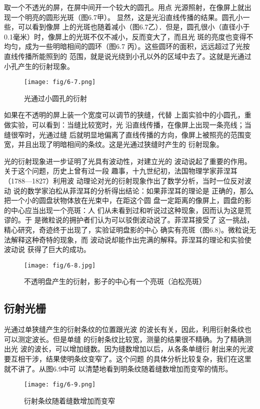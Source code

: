 取一个不透光的屏，在屏中间开一个较大的圆孔。用点
光源照射，在像屏上就出现一个明亮的圆形光斑（图6.7甲）。
显然，这是光沿直线传播的结果。圆孔小一些，可以看到像屏
上的光斑也随着减小（图6.7乙）．但是，圆孔很小（直径小于
0.1毫米）时，像屏上的光斑不仅不减小，反而变大了，而且光
斑的亮度也变得不均匀，成为一些明暗相间的圆环（图6.7
丙）。这些圆环的面积，远远超过了光按直线传播所能照到的
范围，就是说光绕到小孔以外的区域中去了。这就是光通过
小孔产生的衍射现象。
\begin{figure}[htp]\centering
    \texttt{[image: fig/6-7.png]}
    \caption{光通过小圆孔的衍射}
    \end{figure}

如果在不透明的屏上装一个宽度可以调节的狭缝，代替
上面实验中的小圆孔，重做实验，可以看到：当缝比较宽时，光
沿直线传播，在像屏上出现一条亮线；当缝很窄时，光通过缝
后就明显地偏离了直线传播的方向，像屏上被照亮的范围变
宽，并且出现了明暗相间的条纹。这是光通过狭缝时产生的
衍射现象。

光的衍射现象进一步证明了光具有波动性，对建立光的
波动说起了重要的作用。关于这个问题，历史上曾有过一段
趣事，十九世纪初，法国物理学家菲涅耳（1788—1827）利用波
动理论对光的衍射现象作出了数学分析，当时一位反对波动
说的数学家泊松从菲涅耳的分析得出结论：如果菲涅耳的理论是
正确的，那么把一个小的圆盘状物体放在光束中，在距这个圆
盘一定距离的像屏上，圆盘的影的中心应当出现一个亮斑：人
们从未看到过和听说过这种现象，因而认为这是荒谬的。于
是微粒说的拥护者们认为可以驳倒波动说了。菲涅耳接受了
这一挑战，精心研究，奇迹终于出现了，实验证明盘影的中心
确实有亮斑（图6.8)。微粒说无法解释这种奇特的现象，而
波动说却能作出完满的解释。菲涅耳的理论和实验使波动说
获得了巨大的成功。

\begin{figure}[htp]\centering
\texttt{[image: fig/6-8.jpg]}
\caption{不透明盘产生的衍射，影子的中心有一个亮斑（泊松亮斑）}
\end{figure}

\subsection{衍射光栅}

光通过单狭缝产生的衍射条纹的位置跟光波
的波长有关，因此，利用衍射条纹也可以测定波长。但是单缝
的衍射条纹比较宽，测量的结果很不精确。为了精确测出光
波的波长，可以增加缝数。因为缝数增加以后，从各条单缝衍
射出来的光波要互相干涉，结果使明条纹变窄了。这个问题
的具体分析比较复杂，我们在这里就不讲了。从图6.9中可
以清楚地看到明条纹随着缝数增加而变窄的情形。
\begin{figure}[htp]\centering
    \texttt{[image: fig/6-9.png]}
    \caption{衍射条纹随着缝数增加而变窄}
    \end{figure}

